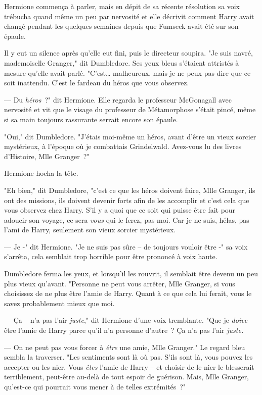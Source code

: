 Hermione commença à parler, mais en dépit de sa récente résolution sa voix trébucha quand même un peu par nervosité et elle décrivit comment Harry avait changé pendant les quelques semaines depuis que Fumseck avait été sur son épaule.

Il y eut un silence après qu'elle eut fini, puis le directeur soupira. "Je suis navré, mademoiselle Granger," dit Dumbledore. Ses yeux bleus s'étaient attristés à mesure qu'elle avait parlé. "C'est… malheureux, mais je ne peux pas dire que ce soit inattendu. C'est le fardeau du héros que vous observez.

--- Du \emph{héros}~?" dit Hermione. Elle regarda le professeur McGonagall avec nervosité et vit que le visage du professeur de Métamorphose s'était pincé, même si sa main toujours rassurante serrait encore son épaule.

"Oui," dit Dumbledore. "J'étais moi-même un héros, avant d'être un vieux sorcier mystérieux, à l'époque où je combattais Grindelwald. Avez-vous lu des livres d'Histoire, Mlle Granger~?"

Hermione hocha la tête.

"Eh bien," dit Dumbledore, "c'est ce que les héros doivent faire, Mlle Granger, ils ont des missions, ils doivent devenir forts afin de les accomplir et c'est cela que vous observez chez Harry. S'il y a quoi que ce soit qui puisse être fait pour adoucir son voyage, ce sera \emph{vous} qui le ferez, pas moi. Car je ne suis, hélas, pas l'ami de Harry, seulement son vieux sorcier mystérieux.

--- Je -" dit Hermione. "Je ne suis pas sûre -- de toujours vouloir être -" sa voix s'arrêta, cela semblait trop horrible pour être prononcé à voix haute.

Dumbledore ferma les yeux, et lorsqu'il les rouvrit, il semblait être devenu un peu plus vieux qu'avant. "Personne ne peut vous arrêter, Mlle Granger, si vous choisissez de ne plus être l'amie de Harry. Quant à ce que cela lui ferait, vous le savez probablement mieux que moi.

--- Ça -- n'a pas l'air \emph{juste}," dit Hermione d'une voix tremblante. "Que je \emph{doive} être l'amie de Harry parce qu'il n'a personne d'autre~? Ça n'a pas l'air \emph{juste.}

--- On ne peut pas vous forcer à \emph{être} une amie, Mlle Granger." Le regard bleu sembla la traverser. "Les sentiments sont là où pas. S'ils sont là, vous pouvez les accepter ou les nier. Vous \emph{êtes} l'amie de Harry -- et choisir de le nier le blesserait terriblement, peut-être au-delà de tout espoir de guérison. Mais, Mlle Granger, qu'est-ce qui pourrait vous mener à de telles extrémités~?"


